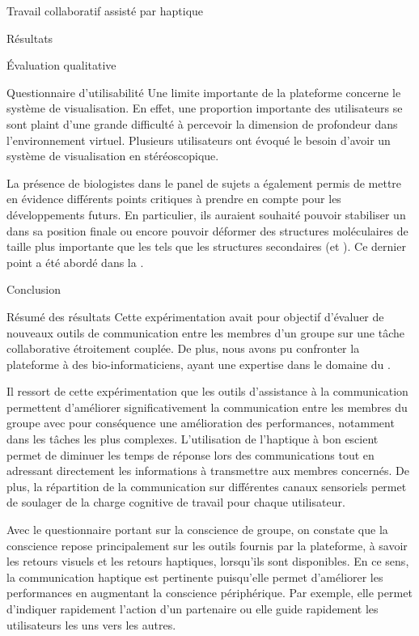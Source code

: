 \documentclass[myfrancais,ngerman,english,french]{mythesis}
\begin{document}
\begin{mychapter}{Travail collaboratif assisté par haptique}
\begin{mysection}{Résultats}
\begin{mysubsection}{Évaluation qualitative}
\begin{mysubsubsection}{Questionnaire d'utilisabilité}
					Une limite importante de la plateforme concerne le système de visualisation.
					En effet, une proportion importante des utilisateurs se sont plaint d'une grande difficulté à percevoir la dimension de profondeur dans l'environnement virtuel.
					Plusieurs utilisateurs ont évoqué le besoin d'avoir un système de visualisation en \myThreeD stéréoscopique.

					La présence de biologistes dans le panel de sujets a également permis de mettre en évidence différents points critiques à prendre en compte pour les développements futurs.
					En particulier, ils auraient souhaité pouvoir stabiliser un  dans sa position finale ou encore pouvoir déformer des structures moléculaires de taille plus importante que les  tels que les structures secondaires (\myhelice* et \myfeuillet*).
					Ce dernier point a été abordé dans la .
				\end{mysubsubsection}
			\end{mysubsection}
		\end{mysection}
		\begin{mysection}{Conclusion}
			\begin{mysubsection}{Résumé des résultats}
				Cette expérimentation avait pour objectif d'évaluer de nouveaux outils de communication entre les membres d'un groupe sur une tâche collaborative étroitement couplée.
				De plus, nous avons pu confronter la plateforme \myShaddock à des bio-informaticiens, ayant une expertise dans le domaine du .

				Il ressort de cette expérimentation que les outils d'assistance à la communication permettent d'améliorer significativement la communication entre les membres du groupe avec pour conséquence une amélioration des performances, notamment dans les tâches les plus complexes.
				L'utilisation de l'haptique à bon escient permet de diminuer les temps de réponse lors des communications tout en adressant directement les informations à transmettre aux membres concernés.
				De plus, la répartition de la communication sur différentes canaux sensoriels permet de soulager de la charge cognitive de travail pour chaque utilisateur.

				Avec le questionnaire portant sur la conscience de groupe, on constate que la conscience repose principalement sur les outils fournis par la plateforme, à savoir les retours visuels et les retours haptiques, lorsqu'ils sont disponibles.
				En ce sens, la communication haptique est pertinente puisqu'elle permet d'améliorer les performances en augmentant la conscience périphérique.
				Par exemple, elle permet d'indiquer rapidement l'action d'un partenaire ou elle guide rapidement les utilisateurs les uns vers les autres.


\end{mysubsection}
\end{mysection}
\end{mychapter}
\end{document}
